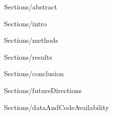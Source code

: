 \documentclass[letterpaper]{article}
\begin{document}
\maketitle

{Sections/abstract}

{Sections/intro}

{Sections/methods}

{Sections/results}

{Sections/conclusion}

{Sections/futureDirections}

{Sections/dataAndCodeAvailability}

\footnotesize


\end{document}
